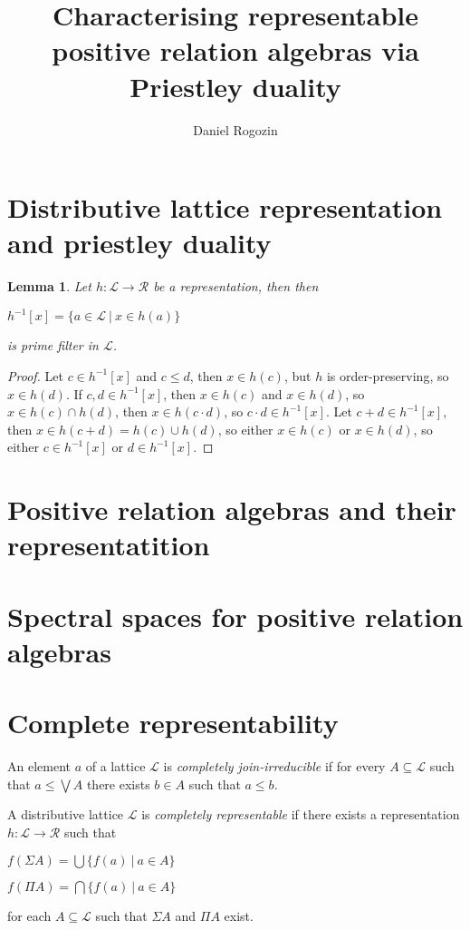 \documentclass[a4paper]{article}
\author{Daniel Rogozin}
\date{}
\title{Characterising representable positive relation algebras via Priestley duality}
\theoremstyle{defin}
\theoremstyle{theorem}
\theoremstyle{claim}
\theoremstyle{prop}
\theoremstyle{lemma}
\newtheorem{lemma}{Lemma}
\theoremstyle{fact}
\theoremstyle{ex}
\theoremstyle{col}
\begin{document}
\maketitle

\nocite{*}

\section{Distributive lattice representation and priestley duality}

\begin{lemma}
Let $h : \mathcal{L} \to \mathcal{R}$ be a representation, then then
\begin{center}
$h^{-1}[x] = \{ a \in \mathcal{L} \: | \: x \in h(a) \}$
\end{center}
is prime filter in $\mathcal{L}$.
\end{lemma}

\begin{proof}
Let $c \in h^{-1}[x]$ and $c \leq d$, then $x \in h(c)$, but $h$ is order-preserving, so $x \in h(d)$. If $c, d \in h^{-1}[x]$, then $x \in h(c)$ and $x \in h(d)$, so $x \in h(c) \cap h(d)$, then $x \in h(c \cdot d)$, so $c \cdot d \in h^{-1}[x]$. Let $c + d \in h^{-1}[x]$, then $x \in h(c + d) = h(c) \cup h(d)$, so either $x \in h(c)$ or $x \in h(d)$, so either $c \in h^{-1}[x]$ or $d \in h^{-1}[x]$.
\end{proof}

\section{Positive relation algebras and their representatition}

\section{Spectral spaces for positive relation algebras}

\section{Complete representability}

An element $a$ of a lattice $\mathcal{L}$ is \emph{completely join-irreducible} if for every $A \subseteq \mathcal{L}$ such that $a \leq \bigvee A$ there exists $b \in A$ such that $a \leq b$.

A distributive lattice $\mathcal{L}$ is \emph{completely representable} if there exists a representation $h : \mathcal{L} \to \mathcal{R}$ such that
\begin{center}
$f(\Sigma A) = \bigcup \{ f(a) \: | \: a \in A\}$

$f(\Pi A) = \bigcap \{ f(a) \: | \: a \in A \}$
\end{center}
for each $A \subseteq \mathcal{L}$ such that $\Sigma A$ and $\Pi A$ exist.
\end{document}
